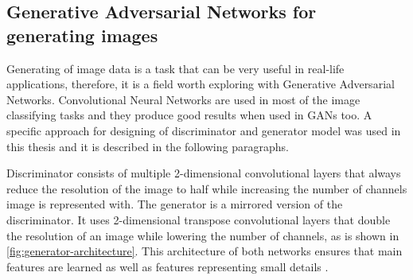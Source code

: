 \subsection*{Generative Adversarial Networks for generating images}
Generating of image data is a task that can be very useful in real-life applications, therefore, it is a field worth exploring with Generative Adversarial Networks. Convolutional Neural Networks are used in most of the image classifying tasks and they produce good results when used in GANs too. A specific approach for designing of discriminator and generator model was used in this thesis and it is described in the following paragraphs.

Discriminator consists of multiple 2-dimensional convolutional layers that always reduce the resolution of the image to half while increasing the number of channels image is represented with. The generator is a mirrored version of the discriminator. It uses 2-dimensional transpose convolutional layers that double the resolution of an image while lowering the number of channels, as is shown in \autoref{fig:generator-architecture}. This architecture of both networks ensures that main features are learned as well as features representing small details \cite{karras2017progressive}.


